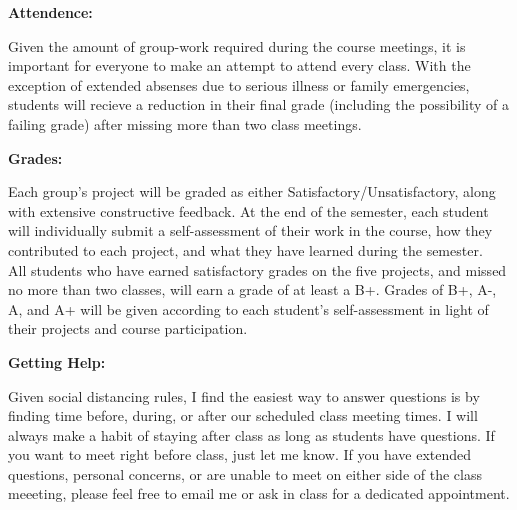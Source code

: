 \documentclass[12pt, a4paper]{article}
\begin{document}
\vspace{12pt}

\textbf{Attendence:} \vspace{6pt}

Given the amount of group-work required during the course meetings, it is
important for everyone to make an attempt to attend every class. With the
exception of extended absenses due to serious illness or family emergencies,
students will recieve a reduction in their final grade (including the
possibility of a failing grade) after missing more than two class meetings.

\vspace{12pt}

\textbf{Grades:} \vspace{6pt}

Each group's project will be graded as either Satisfactory/Unsatisfactory,
along with extensive constructive feedback. At the end of the semester, each
student will individually submit a self-assessment of their work in the course,
how they contributed to each project, and what they have learned during the
semester.\\

All students who have earned satisfactory grades on the five projects, and
missed no more than two classes, will earn a grade of at least a B+. Grades of
B+, A-, A, and A+ will be given according to each student's self-assessment in
light of their projects and course participation.

\vspace{12pt}

\textbf{Getting Help:} \vspace{6pt}

Given social distancing rules, I find the easiest way to answer questions
is by finding time before, during, or after our scheduled class meeting times.
I will always make a habit of staying after class as long as students have
questions. If you want to meet right before class, just let me know.
If you have extended questions, personal concerns, or are unable to meet on
either side of the class meeeting, please feel free to email me or ask in class
for a dedicated appointment.
\end{document}
